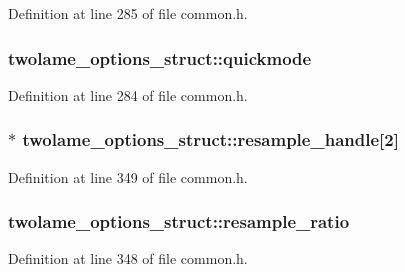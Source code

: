 Definition at line 285 of file common.\+h.

\subsubsection[{\texorpdfstring{quickmode}{quickmode}}]{ twolame\+\_\+options\+\_\+struct\+::quickmode}\hypertarget{structtwolame__options__struct_aefd142ad35e687a25dc01dd2238c8e5b}{}\label{structtwolame__options__struct_aefd142ad35e687a25dc01dd2238c8e5b}


Definition at line 284 of file common.\+h.

\subsubsection[{\texorpdfstring{resample\+\_\+handle}{resample_handle}}]{$\ast$ twolame\+\_\+options\+\_\+struct\+::resample\+\_\+handle\mbox{[}2\mbox{]}}\hypertarget{structtwolame__options__struct_a7c87d6be26872f0425ddccf9982f3adf}{}\label{structtwolame__options__struct_a7c87d6be26872f0425ddccf9982f3adf}


Definition at line 349 of file common.\+h.

\subsubsection[{\texorpdfstring{resample\+\_\+ratio}{resample_ratio}}]{ twolame\+\_\+options\+\_\+struct\+::resample\+\_\+ratio}\hypertarget{structtwolame__options__struct_a0c71f5c89843cb3b04d3313fd4630bda}{}\label{structtwolame__options__struct_a0c71f5c89843cb3b04d3313fd4630bda}


Definition at line 348 of file common.\+h.

